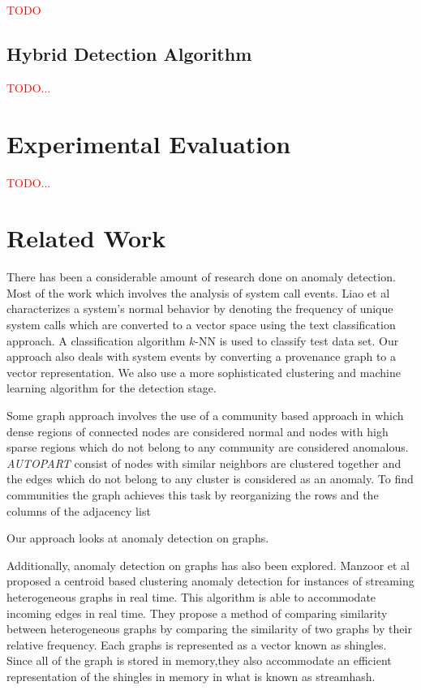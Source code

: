\textcolor{red}{  TODO}

\subsection{Hybrid Detection Algorithm}

\textcolor{red}{TODO...}



\section{Experimental Evaluation}

\textcolor{red}{TODO...}


\section{Related Work}

There has been a considerable amount of research done on anomaly detection. Most of the work which involves the analysis of system call events. Liao et al \cite{liao_using_2002} characterizes a system's normal behavior by denoting the frequency of unique system calls which are converted to a vector space using the text classification approach. A classification algorithm $k$-NN is used to classify test data set. Our approach also deals with system events  by converting a provenance graph to a vector representation. We also use a more sophisticated clustering and machine learning algorithm for the detection stage.


Some graph approach involves the use of a community based approach in which dense regions of connected nodes are considered normal and nodes with high sparse regions which do not belong to any community are considered anomalous. \textit{AUTOPART} consist of nodes with similar neighbors are clustered together and the edges which do not belong to any cluster is considered as an anomaly. To find communities the graph achieves this task by reorganizing the rows and the columns of the adjacency list



Our approach looks at anomaly detection on graphs. 

Additionally, anomaly detection on graphs has also been explored. Manzoor et al \cite{manzoor_fast_2016} proposed a centroid based clustering anomaly detection for instances of streaming heterogeneous graphs in real time.  This algorithm is able to accommodate incoming edges in real time. They propose a method of comparing similarity between heterogeneous graphs by comparing the similarity of two graphs by their relative frequency. Each graphs is represented as a vector known as shingles. Since all of the graph is stored in memory,they also accommodate an efficient representation of the shingles in memory in what is known as streamhash.

